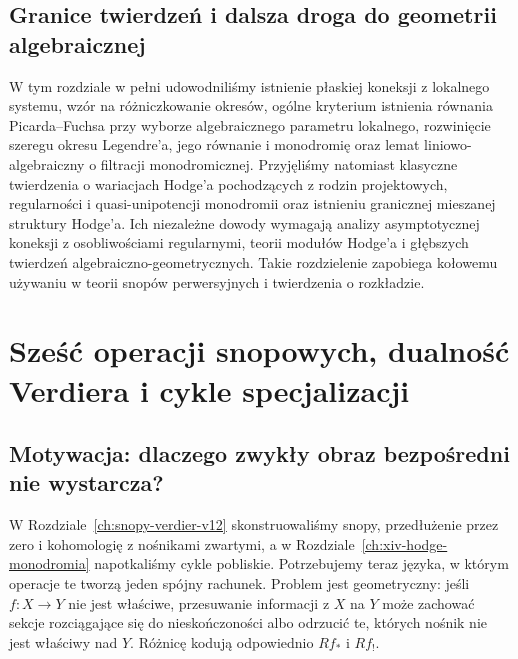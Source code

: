 \documentclass[11pt,a4paper,oneside]{report}
\theoremstyle{plain}
\theoremstyle{definition}
\theoremstyle{remark}
\begin{document}
\section{Granice twierdzeń i dalsza droga do geometrii algebraicznej}
W tym rozdziale w pełni udowodniliśmy istnienie płaskiej
koneksji z lokalnego systemu, wzór na różniczkowanie okresów,
ogólne kryterium istnienia równania Picarda--Fuchsa
przy wyborze algebraicznego parametru lokalnego,
rozwinięcie szeregu okresu Legendre'a, jego równanie i
monodromię oraz lemat liniowo-algebraiczny o filtracji
monodromicznej. Przyjęliśmy natomiast klasyczne twierdzenia
o wariacjach Hodge'a pochodzących z rodzin projektowych,
regularności i quasi-unipotencji monodromii oraz istnieniu
granicznej mieszanej struktury Hodge'a.
Ich niezależne dowody wymagają analizy asymptotycznej
koneksji z osobliwościami regularnymi, teorii modułów
Hodge'a i głębszych twierdzeń algebraiczno-geometrycznych.
Takie rozdzielenie zapobiega kołowemu używaniu
w teorii snopów perwersyjnych i twierdzenia
o rozkładzie.

\chapter{Sześć operacji snopowych, dualność Verdiera i cykle specjalizacji}
\label{ch:xvi-szesc-operacji}

\section{Motywacja: dlaczego zwykły obraz bezpośredni nie wystarcza?}
W Rozdziale~\ref{ch:snopy-verdier-v12} skonstruowaliśmy snopy,
przedłużenie przez zero i kohomologię z nośnikami zwartymi, a w
Rozdziale~\ref{ch:xiv-hodge-monodromia} napotkaliśmy cykle pobliskie.
Potrzebujemy teraz języka, w którym operacje te tworzą jeden spójny
rachunek. Problem jest geometryczny: jeśli $f:X\to Y$ nie jest właściwe,
przesuwanie informacji z $X$ na $Y$ może zachować sekcje rozciągające się
do nieskończoności albo odrzucić te, których nośnik nie jest właściwy
nad $Y$. Różnicę kodują odpowiednio $Rf_*$ i $Rf_!$.
\end{document}

